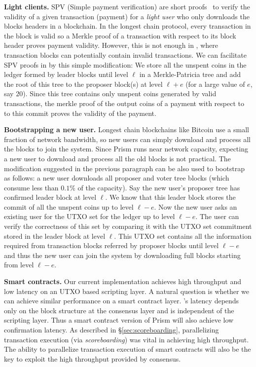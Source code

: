 \noindent \textbf{Light clients.} 
 SPV (Simple payment verification) are short proofs~\cite{spv} to verify the validity of a given transaction (payment) for a \textit{light user} who only downloads the blocks headers in a blockchain.
In the longest chain protocol, every transaction in the block is valid so a Merkle proof of a transaction with respect to its block header proves payment validity.
However, this is not enough in \prism, where transaction blocks can potentially contain invalid transactions. We can facilitate SPV proofs in \prism by this simple modification: We store all the unspent coins in the ledger formed by leader blocks until level $\ell$ in a Merkle-Patricia tree and add the root of this tree to the proposer block(s) at level $\ell+e$ (for a large value of $e$, say $20$). Since this tree contains only unspent coins generated by valid transactions, the merkle proof of the output coins of a payment with respect to to this commit proves the validity of the payment.

\noindent \textbf{Bootstrapping a new user.} 
Longest chain blockchains like Bitcoin use a small fraction of network bandwidth, so new users can simply download and process all the blocks to join the system. 
Since Prism runs near network capacity,  expecting a new user to download and process all the old blocks is not practical. 
The modification suggested in the previous paragraph can be also used to bootstrap as follows: a new user downloads all proposer and voter tree blocks (which consume less than $0.1\%$ of the capacity). Say the new user's proposer tree has confirmed leader block at level $\ell$. 
We know that this leader block stores the commit of all the unspent coins up to level $\ell-e$. 
Now the new user asks an existing user for the UTXO set for the ledger up to level $\ell-e$. The user can verify the correctness of this set by comparing it with the UTXO set commitment stored in the leader block at level $\ell$.
This UTXO set contains all the information required from transaction blocks
referred by proposer blocks until level $\ell-e$ and thus the new user can join the system by downloading full blocks starting from level $\ell-e$.



\noindent \textbf{Smart contracts.} 
 Our current implementation achieves high throughput and low latency on an UTXO based scripting layer. 
 A natural question is whether we can achieve similar performance on a smart contract layer. 
 \prism's latency depends only on the block structure at the consensus layer and is independent of the scripting layer. Thus a smart contract version of Prism will also achieve low confirmation latency. As described in \S\ref{sec:scoreboarding}, parallelizing transaction execution (via \textit{scoreboarding}) was vital in achieving high throughput. The ability to parallelize transaction execution of smart contracts will also be the key to exploit the high throughput provided by \prism consensus. 
 
\fi
